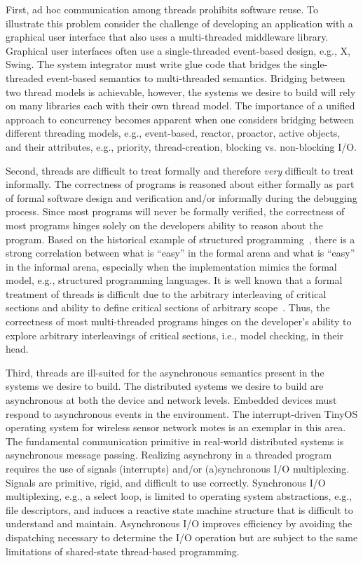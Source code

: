 \documentclass[letterpaper]{article}
\begin{document}
First, ad hoc communication among threads prohibits software reuse.
To illustrate this problem consider the challenge of developing an application with a graphical user interface that also uses a multi-threaded middleware library.
Graphical user interfaces often use a single-threaded event-based design, e.g., X, Swing.
The system integrator must write glue code that bridges the single-threaded event-based semantics to multi-threaded semantics.
Bridging between two thread models is achievable, however, the systems we desire to build will rely on many libraries each with their own thread model.
The importance of a unified approach to concurrency becomes apparent when one considers bridging between different threading models, e.g., event-based, reactor, proactor, active objects, and their attributes, e.g., priority, thread-creation, blocking vs. non-blocking I/O.

Second, threads are difficult to treat formally and therefore \emph{very} difficult to treat informally.
The correctness of programs is reasoned about either formally as part of formal software design and verification and/or informally during the debugging process.
Since most programs will never be formally verified, the correctness of most programs hinges solely on the developers ability to reason about the program.
Based on the historical example of structured programming~\cite{goto_considered_harmful}, there is a strong correlation between what is ``easy'' in the formal arena and what is ``easy'' in the informal arena, especially when the implementation mimics the formal model, e.g., structured programming languages.
It is well known that a formal treatment of threads is difficult due to the arbitrary interleaving of critical sections and ability to define critical sections of arbitrary scope~\cite{lee_threads}.
Thus, the correctness of most multi-threaded programs hinges on the developer's ability to explore arbitrary interleavings of critical sections, i.e., model checking, in their head.

Third, threads are ill-suited for the asynchronous semantics present in the systems we desire to build.
The distributed systems we desire to build are asynchronous at both the device and network levels.
Embedded devices must respond to asynchronous events in the environment.
The interrupt-driven TinyOS operating system for wireless sensor network motes is an exemplar in this area.
The fundamental communication primitive in real-world distributed systems is asynchronous message passing.
Realizing asynchrony in a threaded program requires the use of signals (interrupts) and/or (a)synchronous I/O multiplexing.
Signals are primitive, rigid, and difficult to use correctly.
Synchronous I/O multiplexing, e.g., a select loop, is limited to operating system abstractions, e.g., file descriptors, and induces a reactive state machine structure that is difficult to understand and maintain.
Asynchronous I/O improves efficiency by avoiding the dispatching necessary to determine the I/O operation but are subject to the same limitations of shared-state thread-based programming.
\end{document}

